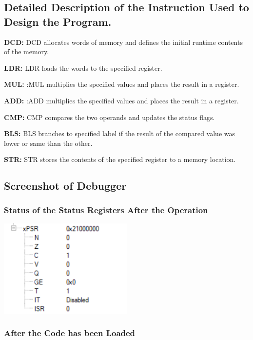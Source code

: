 \documentclass{article}
\begin{document}
\subsection{Detailed Description of the Instruction Used to Design the Program.}

\item \textbf{DCD: }DCD allocates words of memory and defines the initial runtime contents of the memory.
\item \textbf{LDR: }LDR loads the words to the specified register.
\item \textbf{MUL: }:MUL multiplies the specified values and places the result in a register.
\item \textbf{ADD: }:ADD multiplies the specified values and places the result in a register.
\item \textbf{CMP: }CMP compares the two operands and updates the status flags.
\item \textbf{BLS: }BLS branches to specified label if the result of the compared value was lower or same than the other.
\item \textbf{STR: }STR stores the contents of the specified register to a memory location.

\subsection{Screenshot of Debugger}

\subsubsection{Status of the Status Registers After the Operation}

\begin{center}
    \includegraphics[width=0.5\textwidth]{task_iii_A_PSR.png}
\end{center}

\subsubsection{After the Code has been Loaded}
\end{document}

